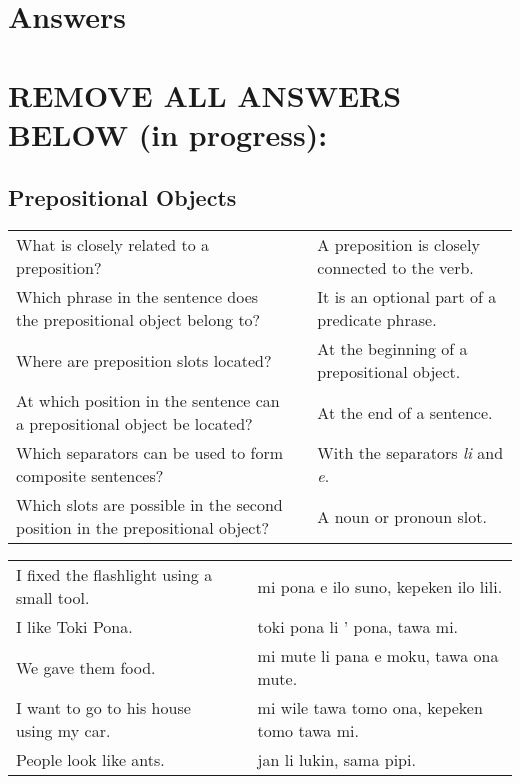 
\section{Answers}
\printsolutions

\section*{REMOVE ALL ANSWERS BELOW (in progress):}

\subsection*{Prepositional Objects}
\label{'prepositional_objects'}

\begin{supertabular}{p{5,5cm}|ll}
    What is closely related to a preposition?                                    &  & A preposition is closely connected to the verb. \\
    Which phrase in the sentence does the prepositional object belong to?        &  & It is an optional part of a predicate phrase.   \\
    Where are preposition slots located?                                         &  & At the beginning of a prepositional object.     \\
    At which position in the sentence can a prepositional object be located?     &  & At the end of a sentence.                       \\
    Which separators can be used to form composite sentences?                    &  & With the separators \textit{li} and \textit{e}. \\
    Which slots are possible in the second position in the prepositional object? &  & A noun or pronoun slot.                         \\
\end{supertabular}

\begin{supertabular}{p{5,5cm}|ll}
    I fixed the flashlight using a small tool. &  & mi pona e ilo suno, kepeken ilo lili.        \\
    I like Toki Pona.                          &  & toki pona li ' pona, tawa mi.                \\
    We gave them food.                         &  & mi mute li pana e moku, tawa ona mute.       \\
    I want to go to his house using my car.    &  & mi wile tawa tomo ona, kepeken tomo tawa mi. \\
    People look like ants.                     &  & jan li lukin, sama pipi.                     \\
\end{supertabular}

